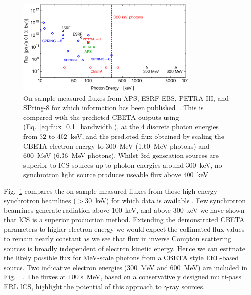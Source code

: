 \documentclass[../main.tex]{subfiles}
\begin{document}
\begin{figure}[!h]
\centering
\includegraphics[width=0.8\textwidth]{Figures/CBETA_Inverse_Compton_Source_Design/sourcefluxcomparison.pdf}
\caption{On-sample measured fluxes from APS, ESRF-EBS, PETRA-III, and SPring-8 for which information has been published~\cite{apsbeamlines,esrfbeamlines,petraiiibeamlines,spring8beamlines}. This is compared with the predicted CBETA outputs using (Eq.~\ref{eq:flux_0.1_bandwidth}), at the 4 discrete photon energies from 32 to 402~\si{\kilo\electronvolt}, and the predicted flux obtained by scaling the CBETA electron energy to 300~\si{\mega\electronvolt} (1.60~\si{\mega\electronvolt} photons) and 600~\si{\mega\electronvolt} (6.36~\si{\mega\electronvolt} photons). Whilst 3rd generation sources are superior to ICS sources up to photon energies around 300~\si{\kilo\electronvolt}, no synchrotron light source produces useable flux above 400~\si{\kilo\electronvolt}.}
\label{fig:ICS_Undulator_Comparison}
\end{figure}
Fig.~\ref{fig:ICS_Undulator_Comparison} compares the on-sample measured fluxes from those high-energy synchrotron beamlines ($>$30~\si{\kilo\electronvolt}) for which data is available \cite{apsbeamlines,esrfbeamlines,petraiiibeamlines,spring8beamlines}. Few synchrotron beamlines generate radiation above 100~\si{\kilo\electronvolt}, and above 300~\si{\kilo\electronvolt} we have shown that ICS is a superior production method. Extending the demonstrated CBETA parameters to higher electron energy we would expect the collimated flux values to remain nearly constant as we see that flux in inverse Compton scattering sources is broadly independent of electron kinetic energy. Hence we can estimate the likely possible flux for \si{\mega\electronvolt}-scale photons from a CBETA style ERL-based source. Two indicative electron energies (300~\si{\mega\electronvolt} and 600~\si{\mega\electronvolt}) are included in Fig.~\ref{fig:ICS_Undulator_Comparison}. The fluxes at 100's~\si{\mega\electronvolt}, based on a conservatively designed multi-pass ERL ICS, highlight the potential of this approach to $\gamma$-ray sources. 
\end{document}
